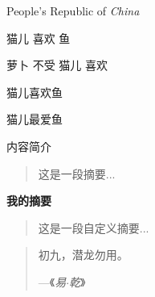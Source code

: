 \documentclass{ctexart}
\newcommand{\PRC}{People's Republic of \emph{China}}
\newcommand{\loves}[2]{#1 喜欢 #2}
\newcommand{\hateby}[2]{#2 不受 #1 喜欢}
\newcommand{\love}[3][喜欢]{#2#1#3}
\renewcommand{\abstractname}{内容简介}
\newenvironment{myabstract}[1][摘要]
{\small
    \begin{center}\bfseries #1\end{center}
    \begin{quotation}}{\end{quotation}
}
\newenvironment{Quotation}[1]
{
    \newcommand{\quotesource}{#1}
    \begin{quotation}}
    {\par \hfill---《\textit{\quotesource}》
    \end{quotation}}
\begin{document}
    \PRC

    \loves{猫儿}{鱼}

    \hateby{猫儿}{萝卜}

    \love{猫儿}{鱼}

    \love[最爱]{猫儿}{鱼}

    \abstractname

    \begin{abstract}
        这是一段摘要...
    \end{abstract}

    \begin{myabstract}[我的摘要]
        这是一段自定义摘要...
    \end{myabstract}

    \begin{Quotation}{易$\cdot$乾}
        初九，潜龙勿用。
    \end{Quotation}
\end{document}
